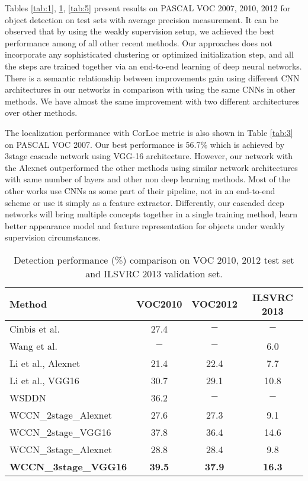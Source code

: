 \documentclass[10pt,twocolumn,letterpaper]{article}
\begin{document}
Tables \ref{tab:1}, \ref{tab:4}, \ref{tab:5} present results on PASCAL VOC 2007, 2010, 2012 for object detection on test sets with average precision measurement. It can be observed that by using the weakly supervision setup, we achieved the best performance among of all other recent methods. Our approaches does not incorporate any sophisticated clustering or optimized initialization step, and all the steps are trained together via an end-to-end learning of deep neural networks. There is a semantic relationship between improvements gain using different CNN architectures in our networks in comparison with using the same CNNs in other methods. We have almost the same improvement with two different architectures over other methods.

The localization performance with {CorLoc} metric is also shown in Table \ref{tab:3} on PASCAL VOC 2007. Our best performance is 56.7\% which is achieved by 3stage cascade network using VGG-16 architecture. However, our network with the Alexnet outperformed the other methods using similar network architectures with same number of layers and other non deep learning methods. Most of the other works use CNNs as some part of their pipeline, not in an end-to-end scheme or use it simply as a feature extractor. Differently, our cascaded deep networks will bring multiple concepts together in a single training method, learn better appearance model and feature representation for objects under weakly supervision circumstances.

\begin{table}[htb] 
\begin{center}
\resizebox{8.4cm}{!} {
\begin{tabular}{|l|c|c|c|}
\hline 
Method &  VOC2010 & VOC2012 & ILSVRC 2013  \\

\hline\hline
Cinbis et al. \cite{cinbis} & 27.4& $-$ & $-$ \\
Wang et al. \cite{wang14}& $-$& $-$  & 6.0 \\
Li et al., Alexnet \cite{li16}& 21.4& 22.4 & 7.7  \\
Li et al., VGG16 \cite{li16} & 30.7& 29.1 & 10.8 \\
WSDDN \cite{bilen16} & 36.2& $-$  & $-$ \\
\hline
WCCN\_2stage\_Alexnet& 27.6 & 27.3 & 9.1 \\
{WCCN\_2stage\_VGG16}& {37.8}& {36.4}  & {14.6}\\
{WCCN\_3stage\_Alexnet}& {28.8}& {28.4}  & {9.8}\\
\textbf{WCCN\_3stage\_VGG16}& \textbf{39.5}& \textbf{37.9}  & \textbf{16.3}\\
\hline
\end{tabular}}
\end{center}
\caption{Detection performance (\%) comparison on VOC 2010, 2012 test set and ILSVRC 2013 validation set.}
  \label{tab:4}
\end{table}
\end{document}
